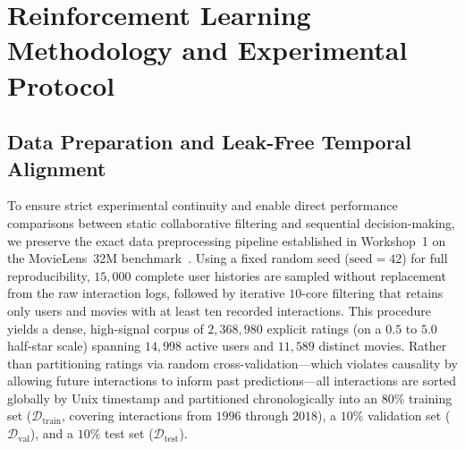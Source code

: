 \section{Reinforcement Learning Methodology and Experimental Protocol}
\label{sec:methods}

\subsection{Data Preparation and Leak-Free Temporal Alignment}
\label{subsec:data_prep}

To ensure strict experimental continuity and enable direct performance comparisons between static collaborative filtering and sequential decision-making, we preserve the exact data preprocessing pipeline established in Workshop~1 on the MovieLens~32M benchmark~\cite{harper2015movielens}. Using a fixed random seed ($\text{seed} = 42$) for full reproducibility, $15{,}000$ complete user histories are sampled without replacement from the raw interaction logs, followed by iterative $10$-core filtering that retains only users and movies with at least ten recorded interactions. This procedure yields a dense, high-signal corpus of $2{,}368{,}980$ explicit ratings (on a $0.5$ to $5.0$ half-star scale) spanning $14{,}998$ active users and $11{,}589$ distinct movies. Rather than partitioning ratings via random cross-validation---which violates causality by allowing future interactions to inform past predictions---all interactions are sorted globally by Unix timestamp and partitioned chronologically into an $80\%$ training set ($\mathcal{D}_{\text{train}}$, covering interactions from $1996$ through $2018$), a $10\%$ validation set ($\mathcal{D}_{\text{val}}$), and a $10\%$ test set ($\mathcal{D}_{\text{test}}$).

